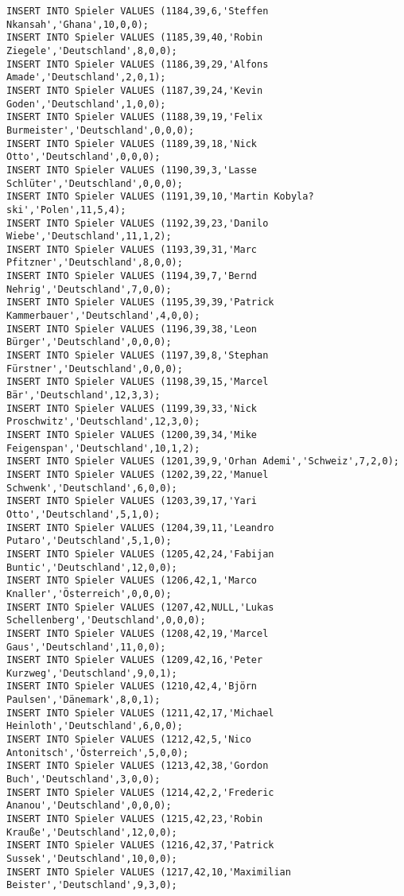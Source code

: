\documentclass{bschlangaul-aufgabe}
\begin{document}
\begin{verbatim}
INSERT INTO Spieler VALUES (1184,39,6,'Steffen Nkansah','Ghana',10,0,0);
INSERT INTO Spieler VALUES (1185,39,40,'Robin Ziegele','Deutschland',8,0,0);
INSERT INTO Spieler VALUES (1186,39,29,'Alfons Amade','Deutschland',2,0,1);
INSERT INTO Spieler VALUES (1187,39,24,'Kevin Goden','Deutschland',1,0,0);
INSERT INTO Spieler VALUES (1188,39,19,'Felix Burmeister','Deutschland',0,0,0);
INSERT INTO Spieler VALUES (1189,39,18,'Nick Otto','Deutschland',0,0,0);
INSERT INTO Spieler VALUES (1190,39,3,'Lasse Schlüter','Deutschland',0,0,0);
INSERT INTO Spieler VALUES (1191,39,10,'Martin Kobyla?ski','Polen',11,5,4);
INSERT INTO Spieler VALUES (1192,39,23,'Danilo Wiebe','Deutschland',11,1,2);
INSERT INTO Spieler VALUES (1193,39,31,'Marc Pfitzner','Deutschland',8,0,0);
INSERT INTO Spieler VALUES (1194,39,7,'Bernd Nehrig','Deutschland',7,0,0);
INSERT INTO Spieler VALUES (1195,39,39,'Patrick Kammerbauer','Deutschland',4,0,0);
INSERT INTO Spieler VALUES (1196,39,38,'Leon Bürger','Deutschland',0,0,0);
INSERT INTO Spieler VALUES (1197,39,8,'Stephan Fürstner','Deutschland',0,0,0);
INSERT INTO Spieler VALUES (1198,39,15,'Marcel Bär','Deutschland',12,3,3);
INSERT INTO Spieler VALUES (1199,39,33,'Nick Proschwitz','Deutschland',12,3,0);
INSERT INTO Spieler VALUES (1200,39,34,'Mike Feigenspan','Deutschland',10,1,2);
INSERT INTO Spieler VALUES (1201,39,9,'Orhan Ademi','Schweiz',7,2,0);
INSERT INTO Spieler VALUES (1202,39,22,'Manuel Schwenk','Deutschland',6,0,0);
INSERT INTO Spieler VALUES (1203,39,17,'Yari Otto','Deutschland',5,1,0);
INSERT INTO Spieler VALUES (1204,39,11,'Leandro Putaro','Deutschland',5,1,0);
INSERT INTO Spieler VALUES (1205,42,24,'Fabijan Buntic','Deutschland',12,0,0);
INSERT INTO Spieler VALUES (1206,42,1,'Marco Knaller','Österreich',0,0,0);
INSERT INTO Spieler VALUES (1207,42,NULL,'Lukas Schellenberg','Deutschland',0,0,0);
INSERT INTO Spieler VALUES (1208,42,19,'Marcel Gaus','Deutschland',11,0,0);
INSERT INTO Spieler VALUES (1209,42,16,'Peter Kurzweg','Deutschland',9,0,1);
INSERT INTO Spieler VALUES (1210,42,4,'Björn Paulsen','Dänemark',8,0,1);
INSERT INTO Spieler VALUES (1211,42,17,'Michael Heinloth','Deutschland',6,0,0);
INSERT INTO Spieler VALUES (1212,42,5,'Nico Antonitsch','Österreich',5,0,0);
INSERT INTO Spieler VALUES (1213,42,38,'Gordon Buch','Deutschland',3,0,0);
INSERT INTO Spieler VALUES (1214,42,2,'Frederic Ananou','Deutschland',0,0,0);
INSERT INTO Spieler VALUES (1215,42,23,'Robin Krauße','Deutschland',12,0,0);
INSERT INTO Spieler VALUES (1216,42,37,'Patrick Sussek','Deutschland',10,0,0);
INSERT INTO Spieler VALUES (1217,42,10,'Maximilian Beister','Deutschland',9,3,0);

\end{verbatim}
\end{document}
